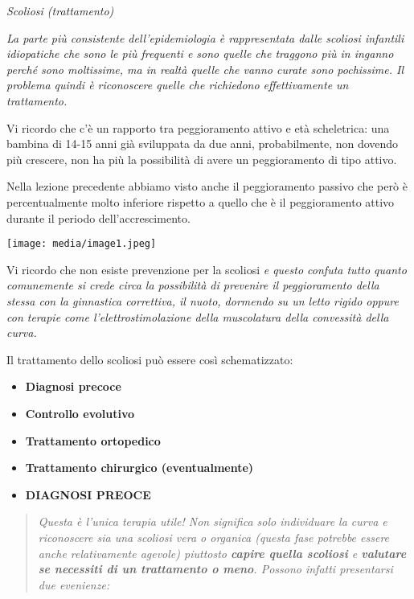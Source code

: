 \documentclass[]{article}
\date{}
\begin{document}
\emph{Scoliosi (trattamento)}

\emph{La parte più consistente dell'epidemiologia è rappresentata dalle
scoliosi infantili idiopatiche che sono le più frequenti e sono quelle
che traggono più in inganno perché sono moltissime, ma in realtà quelle
che vanno curate sono pochissime. Il problema quindi è riconoscere
quelle che richiedono effettivamente un trattamento.}

Vi ricordo che c'è un rapporto tra peggioramento attivo e età
scheletrica: una bambina di 14-15 anni già sviluppata da due anni,
probabilmente, non dovendo più crescere, non ha più la possibilità di
avere un peggioramento di tipo attivo.

Nella lezione precedente abbiamo visto anche il peggioramento passivo
che però è percentualmente molto inferiore rispetto a quello che è il
peggioramento attivo durante il periodo dell'accrescimento.

\texttt{[image: media/image1.jpeg]}

Vi ricordo che non esiste prevenzione per la scoliosi \emph{e questo
confuta tutto quanto comunemente si crede circa la possibilità di
prevenire il peggioramento della stessa con la ginnastica correttiva, il
nuoto, dormendo su un letto rigido oppure con terapie come
l'elettrostimolazione della muscolatura della convessità della curva.}

Il trattamento dello scoliosi può essere così schematizzato:

\begin{itemize}
\item
  \textbf{Diagnosi precoce}
\item
  \textbf{Controllo evolutivo}
\item
  \textbf{Trattamento ortopedico}
\item
  \textbf{Trattamento chirurgico (eventualmente)}
\end{itemize}

\begin{itemize}
\item
  \textbf{DIAGNOSI PREOCE}
\end{itemize}

\begin{quote}
\emph{Questa è l'unica terapia utile! Non significa solo individuare la
curva e riconoscere sia una scoliosi vera o organica (questa fase
potrebbe essere anche relativamente agevole) piuttosto
\textbf{\emph{capire quella scoliosi}} e \textbf{\emph{valutare se
necessiti di un trattamento o meno}}. Possono infatti presentarsi due
evenienze:}
\end{quote}
\end{document}
